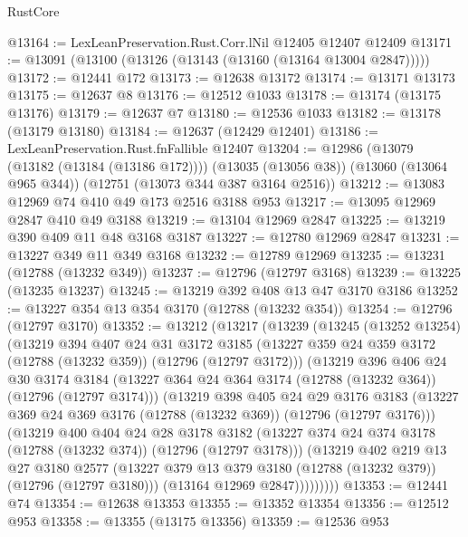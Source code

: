 \begin{lexlean}{RustCore}
\begin{coremodule}
@13164 := LexLeanPreservation.Rust.Corr.lNil @12405 @12407 @12409
@13171 := @13091 (@13100 (@13126 (@13143 (@13160 (@13164 @13004 @2847)))))
@13172 := @12441 @172
@13173 := @12638 @13172
@13174 := @13171 @13173
@13175 := @12637 @8
@13176 := @12512 @1033
@13178 := @13174 (@13175 @13176)
@13179 := @12637 @7
@13180 := @12536 @1033
@13182 := @13178 (@13179 @13180)
@13184 := @12637 (@12429 @12401)
@13186 := LexLeanPreservation.Rust.fnFallible @12407
@13204 := @12986
    (@13079 (@13182 (@13184 (@13186 @172))))
    (@13035 (@13056 @38))
    (@13060 (@13064 @965 @344))
    (@12751 (@13073 @344 @387 @3164 @2516))
@13212 := @13083 @12969 @74 @410 @49 @173 @2516 @3188 @953
@13217 := @13095 @12969 @2847 @410 @49 @3188
@13219 := @13104 @12969 @2847
@13225 := @13219 @390 @409 @11 @48 @3168 @3187
@13227 := @12780 @12969 @2847
@13231 := @13227 @349 @11 @349 @3168
@13232 := @12789 @12969
@13235 := @13231 (@12788 (@13232 @349))
@13237 := @12796 (@12797 @3168)
@13239 := @13225 (@13235 @13237)
@13245 := @13219 @392 @408 @13 @47 @3170 @3186
@13252 := @13227 @354 @13 @354 @3170 (@12788 (@13232 @354))
@13254 := @12796 (@12797 @3170)
@13352 := @13212
    (@13217
      (@13239
        (@13245
          (@13252 @13254)
          (@13219
            @394
            @407
            @24
            @31
            @3172
            @3185
            (@13227 @359 @24 @359 @3172 (@12788 (@13232 @359)) (@12796 (@12797 @3172)))
            (@13219
              @396
              @406
              @24
              @30
              @3174
              @3184
              (@13227 @364 @24 @364 @3174 (@12788 (@13232 @364)) (@12796 (@12797 @3174)))
              (@13219
                @398
                @405
                @24
                @29
                @3176
                @3183
                (@13227 @369 @24 @369 @3176 (@12788 (@13232 @369)) (@12796 (@12797 @3176)))
                (@13219
                  @400
                  @404
                  @24
                  @28
                  @3178
                  @3182
                  (@13227 @374 @24 @374 @3178 (@12788 (@13232 @374)) (@12796 (@12797 @3178)))
                  (@13219
                    @402
                    @219
                    @13
                    @27
                    @3180
                    @2577
                    (@13227 @379 @13 @379 @3180 (@12788 (@13232 @379)) (@12796 (@12797 @3180)))
                    (@13164 @12969 @2847)))))))))
@13353 := @12441 @74
@13354 := @12638 @13353
@13355 := @13352 @13354
@13356 := @12512 @953
@13358 := @13355 (@13175 @13356)
@13359 := @12536 @953

\end{coremodule}
\end{lexlean}
